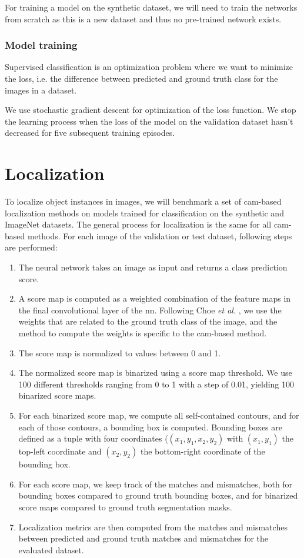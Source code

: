 For training a model on the synthetic dataset, we will need to train the networks from scratch as this is a new dataset and thus no pre-trained network exists.

\subsubsection{Model training}
Supervised classification is an optimization problem where we want to minimize the loss, i.e. the difference between predicted and ground truth class for the images in a dataset.

We use stochastic gradient descent for optimization of the loss function. We stop the learning process when the loss of the model on the validation dataset hasn't decreased for five subsequent training episodes.

\section{Localization} \label{lb:wsol_methods}
To localize object instances in images, we will benchmark a set of \acrshort{cam}-based localization methods on models trained for classification on the synthetic and ImageNet datasets. The general process for localization is the same for all \acrshort{cam}-based methods. For each image of the validation or test dataset, following steps are performed:
\begin{enumerate}
    \item The neural network takes an image as input and returns a class prediction score.
    \item A score map is computed as a weighted combination of the feature maps in the final convolutional layer of the \acrshort{nn}. Following Choe \textit{et al.} \cite{choe2020evaluating}, we use the weights that are related to the ground truth class of the image, and the method to compute the weights is specific to the \acrshort{cam}-based method.
    \item The score map is normalized to values between 0 and 1.
    \item The normalized score map is binarized using a score map threshold. We use 100 different thresholds ranging from 0 to 1 with a step of 0.01, yielding 100 binarized score maps.
    \item For each binarized score map, we compute all self-contained contours, and for each of those contours, a bounding box is computed. Bounding boxes are defined as a tuple with four coordinates ($(x_1, y_1, x_2, y_2)$ with $(x_1, y_1)$ the top-left coordinate and $(x_2, y_2)$ the bottom-right coordinate of the bounding box.
    \item For each score map, we keep track of the matches and mismatches, both for bounding boxes compared to ground truth bounding boxes, and for binarized score maps compared to ground truth segmentation masks.
    \item Localization metrics are then computed from the matches and mismatches between  predicted and ground truth matches and mismatches for the evaluated dataset.
\end{enumerate}
